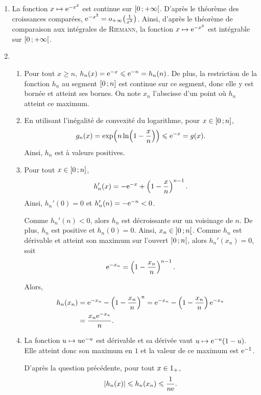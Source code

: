 \begin{preuve}
\begin{enumerate}
\item La fonction $x \mapsto \mathrm{e}^{-x^2}$ est continue sur $\left[0\,;+\infty\right[$. D'après le théorème des croissances comparées, $\mathrm{e}^{-x^2} = o_{+\infty}\mathopen{}\left(\frac{1}{x^2}\right)$. Ainsi, d'après le théorème de comparaison aux intégrales de \textsc{Riemann}, la fonction $x \mapsto \mathrm{e}^{-x^2}$ est intégrable sur $\left[0\,;+\infty\right[$.

\item
\begin{enumerate}
\item Pour tout $x \geqslant n$, $h_n(x) = \mathrm{e}^{-x} \leqslant \mathrm{e}^{-n} = h_n(n)$. De plus, la restriction de la fonction $h_n$ au segment $\left[0\,;n\right]$ est continue sur ce segment, donc elle y est bornée et atteint ses bornes. On note $x_n$ l'abscisse d'un point où $h_n$ atteint ce maximum.

\item En utilisant l'inégalité de convexité du logarithme, pour $x \in \left[0\,;n\right]$,
\[
g_n(x)
= \exp\mathopen{}\left(n \ln\mathopen{}\left(1 - \frac{x}{n}\right)\right)
\leqslant \mathrm{e}^{-x} = g(x).
\]
Ainsi, $h_n$ est à valeurs positives.

\item Pour tout $x \in \left[0\,;n\right]$,
\[
h_n'(x) = -\mathrm{e}^{-x} + \left(1 - \frac{x}{n}\right)^{n-1}.
\]
Ainsi, $h_n'(0) = 0$ et $h_n'(n) = - \mathrm{e}^{-n} < 0$.

Comme $h_n'(n) < 0$, alors $h_n$ est décroissante sur un voisinage de $n$. De plus, $h_n$ est positive et $h_n(0) = 0$. Ainsi, $x_n \in \left]0\,;n\right[$. Comme $h_n$ est dérivable et atteint son maximum sur l'ouvert $\left]0\,;n\right[$, alors $h_n'(x_n) = 0$, soit
\[
\mathrm{e}^{-x_n} = \left(1 - \frac{x_n}{n}\right)^{n-1}.
\]

Alors,
\begin{align*}
h_n(x_n)
&= \mathrm{e}^{-x_n} - \left(1 - \frac{x_n}{n}\right)^n
= \mathrm{e}^{-x_n} - \left(1 - \frac{x_n}{n}\right) \mathrm{e}^{-x_n}\\
&= \frac{x_n \mathrm{e}^{-x_n}}{n}.
\end{align*}

\item La fonction $u \mapsto u \mathrm{e}^{-u}$ est dérivable et sa dérivée vaut $u \mapsto \mathrm{e}^{-u} (1 - u)$. Elle atteint donc son maximum en $1$ et la valeur de ce maximum est $\mathrm{e}^{-1}$.

D'après la question précédente, pour tout $x \in 1_+$,
\begin{align*}
\left| h_n(x) \right|
\leqslant h_n(x_n)
\leqslant \frac{1}{n \mathrm{e}}.
\end{align*}


\end{enumerate}
\end{enumerate}
\end{preuve}
